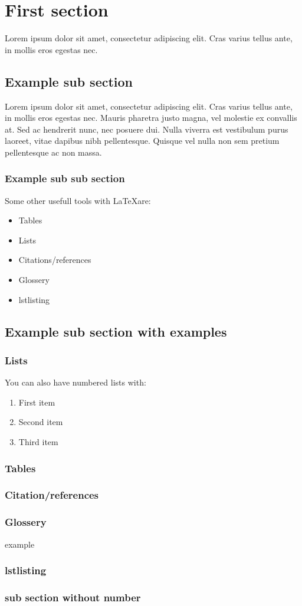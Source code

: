 \section{First section}\label{examplelabel}
Lorem ipsum dolor sit amet, consectetur adipiscing elit. Cras varius tellus ante, in mollis eros egestas nec. 
\subsection{Example sub section}
Lorem ipsum dolor sit amet, consectetur adipiscing elit. Cras varius tellus ante, in mollis eros egestas nec. Mauris pharetra justo magna, vel molestie ex convallis at. Sed ac hendrerit nunc, nec posuere dui. Nulla viverra est vestibulum purus laoreet, vitae dapibus nibh pellentesque. Quisque vel nulla non sem pretium pellentesque ac non massa. 
\subsubsection{Example sub sub section}
Some other usefull tools with \LaTeX are:
\begin{itemize}
    \item Tables
    \item Lists
    \item Citations/references
    \item Glossery
    \item lstlisting
\end{itemize}

\subsection{Example sub section with examples}
\subsubsection{Lists}
You can also have numbered lists with:
\begin{enumerate}
    \item First item
    \item Second item
    \item Third item
\end{enumerate}
\subsubsection{Tables}

\subsubsection{Citation/references}
\cite{example}

\subsubsection{Glossery}
\gls{example}

\subsubsection{lstlisting}

\subsubsection*{sub section without number}